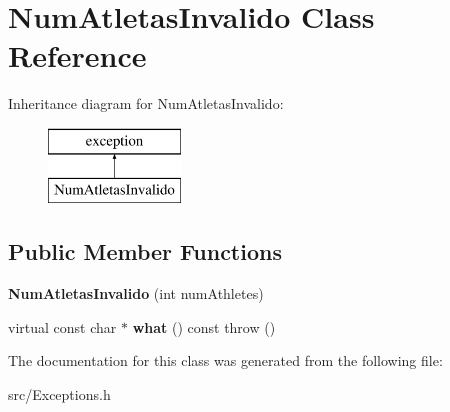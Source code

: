 \hypertarget{class_num_atletas_invalido}{}\section{Num\+Atletas\+Invalido Class Reference}
\label{class_num_atletas_invalido}
Inheritance diagram for Num\+Atletas\+Invalido\+:\begin{figure}[H]
\begin{center}
\leavevmode
\includegraphics[height=2.000000cm]{class_num_atletas_invalido}
\end{center}
\end{figure}
\subsection*{Public Member Functions}
\begin{DoxyCompactItemize}
\item 
\hypertarget{class_num_atletas_invalido_a301bd07fd24736c82d39a2a5a1ae93ca}{}{\bfseries Num\+Atletas\+Invalido} (int num\+Athletes)\label{class_num_atletas_invalido_a301bd07fd24736c82d39a2a5a1ae93ca}

\item 
\hypertarget{class_num_atletas_invalido_a818ae652f26b2aef03e93457f7dc6a43}{}virtual const char $\ast$ {\bfseries what} () const   throw ()\label{class_num_atletas_invalido_a818ae652f26b2aef03e93457f7dc6a43}

\end{DoxyCompactItemize}


The documentation for this class was generated from the following file\+:\begin{DoxyCompactItemize}
\item 
src/Exceptions.\+h\end{DoxyCompactItemize}
